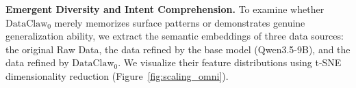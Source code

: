 





\textbf{Emergent Diversity and Intent Comprehension.}
To examine whether $\text{DataClaw}_0$ merely memorizes surface patterns or demonstrates genuine generalization ability, 
we extract the semantic embeddings of three data sources: the original Raw Data, 
the data refined by the base model (Qwen3.5-9B), and the data refined by $\text{DataClaw}_0$. 
We visualize their feature distributions using t-SNE dimensionality reduction (Figure~\ref{fig:scaling_omni}). 

